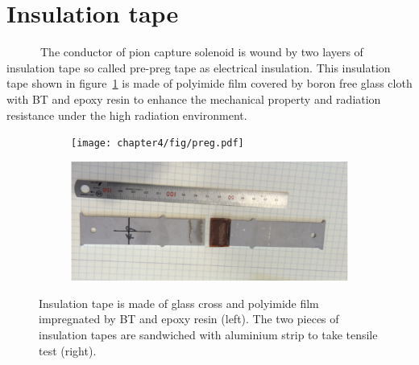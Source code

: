 \section{Insulation tape}
~~~~~~The conductor of pion capture solenoid is wound by two layers of insulation tape so called pre-preg tape as electrical insulation.
This insulation tape shown in figure~\ref{3stur} is made of polyimide film covered by boron free glass cloth with BT and epoxy resin to enhance the mechanical property and radiation resistance under the high radiation environment.
 \begin{figure}[H]
  \begin{subfigure}{0.3\textwidth}
  \centering
  \texttt{[image: chapter4/fig/preg.pdf]}
  \end{subfigure}
  \hspace{0.2\textwidth}
  \begin{subfigure}{0.3\textwidth}
  \centering
  \includegraphics[scale=0.30]{chapter4/fig/BUGT.pdf}
  \end{subfigure}
  \caption{Insulation tape is made of glass cross and polyimide film impregnated by BT and epoxy resin (left). The two pieces of insulation tapes are sandwiched with aluminium strip to take tensile test (right).}
 \label{3stur}
 \end{figure}
